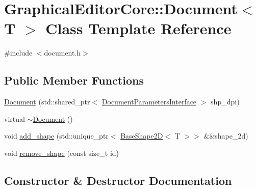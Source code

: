 \hypertarget{classGraphicalEditorCore_1_1Document}{}\section{Graphical\+Editor\+Core\+:\+:Document$<$ T $>$ Class Template Reference}
\label{classGraphicalEditorCore_1_1Document}


{\ttfamily \#include $<$document.\+h$>$}

\subsection*{Public Member Functions}
\begin{DoxyCompactItemize}
\item 
\hyperlink{classGraphicalEditorCore_1_1Document_a60780d888bf00a262dc1df546b3660ea}{Document} (std\+::shared\+\_\+ptr$<$ \hyperlink{classGraphicalEditorCore_1_1DocumentParametersInterface}{Document\+Parameters\+Interface} $>$ shp\+\_\+dpi)
\item 
virtual \hyperlink{classGraphicalEditorCore_1_1Document_a4cadcf8e4a1e1873b372db9740db06f0}{$\sim$\+Document} ()
\item 
void \hyperlink{classGraphicalEditorCore_1_1Document_abe527194c1568fd30d2aaaa3892d024a}{add\+\_\+shape} (std\+::unique\+\_\+ptr$<$ \hyperlink{classGraphicalEditorCore_1_1BaseShape2D}{Base\+Shape2D}$<$ T $>$$>$ \&\&shape\+\_\+2d)
\item 
void \hyperlink{classGraphicalEditorCore_1_1Document_aac9bdac723068023fa0f46f021114566}{remove\+\_\+shape} (const size\+\_\+t id)
\end{DoxyCompactItemize}


\subsection{Constructor \& Destructor Documentation}
